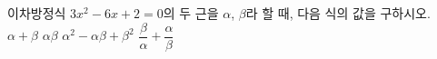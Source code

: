 이차방정식 $3x^2-6x+2=0$의 두 근을 $\alpha$, $\beta$라 할 때, 다음 식의 값을 구하시오.
 $\alpha+\beta$
 $\alpha\beta$
 $\alpha^2-\alpha\beta+\beta^2$
 $\dfrac{\beta}{\alpha}+\dfrac{\alpha}{\beta}$

